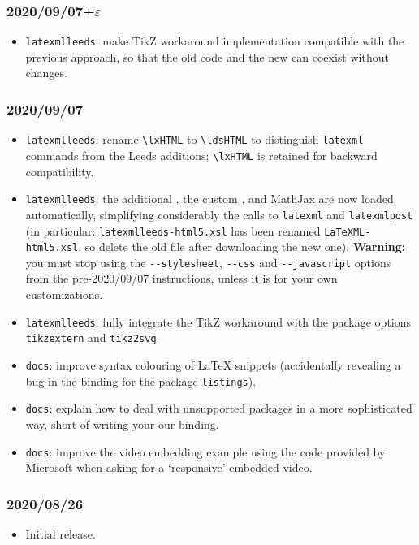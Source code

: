 \documentclass[a4paper]{article}
\def\ltxinline{\lstinline[style=latexml,frame=none]}
\theoremstyle{definition}
\begin{document}
\subsubsection*{2020/09/07+\texorpdfstring{$\varepsilon$}{ɛ}}
\begin{itemize}
  \item \verb|latexmlleeds|: make TikZ workaround implementation compatible with the previous approach, so that the old code and the new can coexist without changes.
\end{itemize}
\subsubsection*{2020/09/07}
\begin{itemize}
  \item \verb|latexmlleeds|: rename \ltxinline|\lxHTML| to \ltxinline|\ldsHTML| to distinguish \verb|latexml| commands from the Leeds additions; \ltxinline|\lxHTML| is retained for backward compatibility.
  \item \verb|latexmlleeds|: the additional \CSS{}, the custom \XSLT{}, and MathJax are now loaded automatically, simplifying considerably the calls to \verb|latexml| and \verb|latexmlpost| (in particular: \verb|latexmlleeds-html5.xsl| has been renamed \verb|LaTeXML-html5.xsl|, so delete the old file after downloading the new one). \textbf{Warning:} you must stop using the \verb|--stylesheet|, \verb|--css| and \verb|--javascript| options from the pre-2020/09/07 instructions, unless it is for your own customizations.
  \item \verb|latexmlleeds|: fully integrate the TikZ workaround with the package options \verb|tikzextern| and \verb|tikz2svg|.
  \item \verb|docs|: improve syntax colouring of \LaTeX{} snippets (accidentally revealing a bug in the \LaTeXML{} binding for the package \verb|listings|).
  \item \verb|docs|: explain how to deal with unsupported packages in a more sophisticated way, short of writing your our \LaTeXML{} binding.
  \item \verb|docs|: improve the video embedding example using the code provided by Microsoft when asking for a `responsive' embedded video.
\end{itemize}
\subsubsection*{2020/08/26}
\begin{itemize}
  \item Initial release.
\end{itemize}
\end{document}
